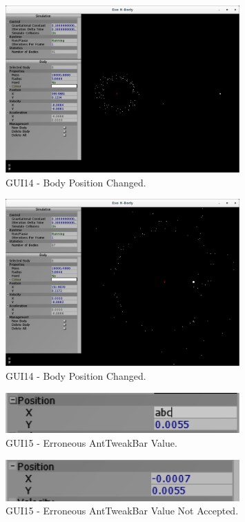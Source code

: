 \begin{figure}[H]
  \centering
  \includegraphics[width=0.8\textwidth]{img/testingEvidence/gui14_1.png}
  \caption{GUI14 - Body Position Changed.}
\end{figure}

\begin{figure}[H]
  \centering
  \includegraphics[width=0.8\textwidth]{img/testingEvidence/gui14_2.png}
  \caption{GUI14 - Body Position Changed.}
\end{figure}

\begin{figure}[H]
  \centering
  \includegraphics[width=0.8\textwidth]{img/testingEvidence/gui15_0.png}
  \caption{GUI15 - Erroneous AntTweakBar Value.}
\end{figure}

\begin{figure}[H]
  \centering
  \includegraphics[width=0.8\textwidth]{img/testingEvidence/gui15_1.png}
  \caption{GUI15 - Erroneous AntTweakBar Value Not Accepted.}
\end{figure}

